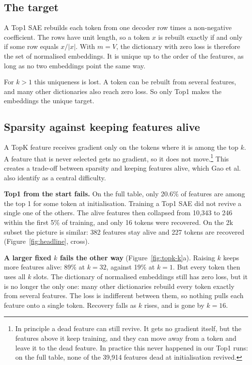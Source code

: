 \documentclass[11pt]{article}
\newcommand{\norm}[1]{\lvert #1\rvert}
\begin{document}
\subsection{The target}
\label{sec:topk-target}

A Top1 SAE rebuilds each token from one decoder row times a non-negative coefficient. The rows have unit length, so a token $x$ is rebuilt exactly if and only if some row equals $x/\norm{x}$. With $m = V$, the dictionary with zero loss is therefore the set of normalised embeddings. It is unique up to the order of the features, as long as no two embeddings point the same way.

For $k > 1$ this uniqueness is lost. A token can be rebuilt from several features, and many other dictionaries also reach zero loss. So only Top1 makes the embeddings the unique target.

\subsection{Sparsity against keeping features alive}
\label{sec:tradeoff}

A TopK feature receives gradient only on the tokens where it is among the top $k$. A feature that is never selected gets no gradient, so it does not move.\footnote{In principle a dead feature can still revive. It gets no gradient itself, but the features above it keep training, and they can move away from a token and leave it to the dead feature. In practice this never happened in our Top1 runs: on the full table, none of the 39,914 features dead at initialisation revived.} This creates a trade-off between sparsity and keeping features alive, which Gao et al.~\cite{gao2024scaling} also identify as a central difficulty.

\textbf{Top1 from the start fails.} On the full table, only 20.6\% of features are among the top 1 for some token at initialisation. Training a Top1 SAE did not revive a single one of the others. The alive features then collapsed from 10,343 to 246 within the first 5\% of training, and only 16 tokens were recovered. On the 2k subset the picture is similar: 382 features stay alive and 227 tokens are recovered (Figure~\ref{fig:headline}, cross).

\textbf{A larger fixed $k$ fails the other way} (Figure~\ref{fig:topk-k}a). Raising $k$ keeps more features alive: 89\% at $k = 32$, against 19\% at $k = 1$. But every token then uses all $k$ slots. The dictionary of normalised embeddings still has zero loss, but it is no longer the only one: many other dictionaries rebuild every token exactly from several features. The loss is indifferent between them, so nothing pulls each feature onto a single token. Recovery falls as $k$ rises, and is gone by $k = 16$.
\end{document}
